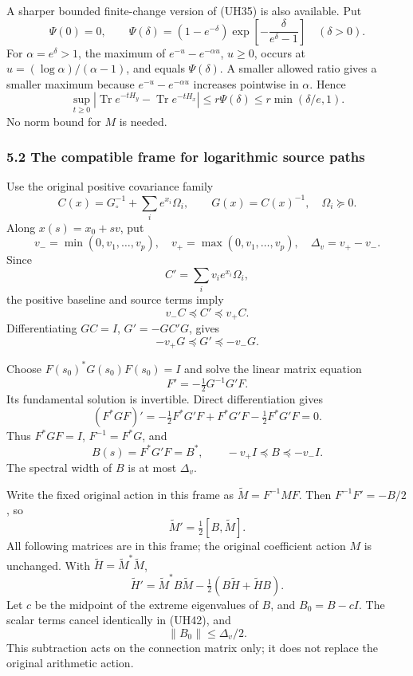 \documentclass[11pt]{article}
\begin{document}
A sharper bounded finite-change version of (UH35) is also available. Put \[
 \Psi(0)=0,\qquad
 \Psi(\delta)=(1-e^{-\delta})
     \exp\left[-\frac{\delta}{e^\delta-1}\right]\quad(\delta>0).
\] For \(\alpha=e^\delta>1\), the maximum of \(e^{-u}-e^{-\alpha u}\), \(u\ge0\), occurs at \(u=(\log\alpha)/(\alpha-1)\), and equals \(\Psi(\delta)\). A smaller allowed ratio gives a smaller maximum because \(e^{-u}-e^{-\alpha u}\) increases pointwise in \(\alpha\). Hence \[
 \sup_{t\ge0}|\operatorname{Tr}e^{-tH_y}-\operatorname{Tr}e^{-tH_x}|
 \le r\Psi(\delta)\le r\min(\delta/e,1).
 \tag{UH37}
\] No norm bound for \(M\) is needed.

\subsubsection{5.2 The compatible frame for logarithmic source paths}\label{the-compatible-frame-for-logarithmic-source-paths}

Use the original positive covariance family \[
 C(x)=G_\circ^{-1}+\sum_i e^{x_i}\Omega_i,\qquad G(x)=C(x)^{-1},
 \quad\Omega_i\succeq0.
\] Along \(x(s)=x_0+sv\), put \[
 v_-=\min(0,v_1,\ldots,v_p),\quad
 v_+=\max(0,v_1,\ldots,v_p),\quad
 \Delta_v=v_+-v_-.
\] Since \[
 C'=\sum_i v_i e^{x_i}\Omega_i,
\] the positive baseline and source terms imply \[
 v_-C\preceq C'\preceq v_+C.
\] Differentiating \(GC=I\), \(G'=-GC'G\), gives \[
 -v_+G\preceq G'\preceq-v_-G.
 \tag{UH38}
\]

Choose \(F(s_0)^*G(s_0)F(s_0)=I\) and solve the linear matrix equation \[
 F'=-\tfrac12G^{-1}G'F.
 \tag{UH39}
\] Its fundamental solution is invertible. Direct differentiation gives \[
 (F^*GF)'=-\tfrac12F^*G'F+F^*G'F-\tfrac12F^*G'F=0.
\] Thus \(F^*GF=I\), \(F^{-1}=F^*G\), and \[
 B(s)=F^*G'F=B^*,\qquad -v_+I\preceq B\preceq-v_-I.
 \tag{UH40}
\] The spectral width of \(B\) is at most \(\Delta_v\).

Write the fixed original action in this frame as \(\widetilde M=F^{-1}MF\). Then \(F^{-1}F'=-B/2\), so \[
 \widetilde M'=\tfrac12[B,\widetilde M].
 \tag{UH41}
\] All following matrices are in this frame; the original coefficient action \(M\) is unchanged. With \(\widetilde H=\widetilde M^*\widetilde M\), \[
 \widetilde H'=\widetilde M^*B\widetilde M
                  -\tfrac12(B\widetilde H+\widetilde H B).
 \tag{UH42}
\] Let \(c\) be the midpoint of the extreme eigenvalues of \(B\), and \(B_0=B-cI\). The scalar terms cancel identically in (UH42), and \[
 \|B_0\|\le\Delta_v/2.
 \tag{UH43}
\] This subtraction acts on the connection matrix only; it does not replace the original arithmetic action.
\end{document}
